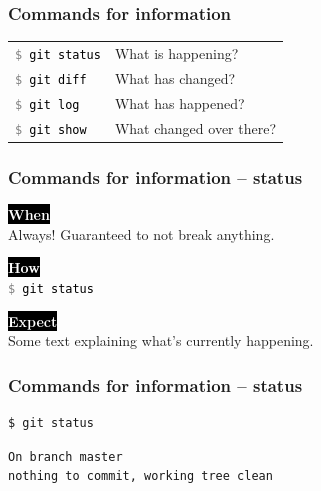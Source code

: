\documentclass{beamer}
\newcommand{\keyword}[1]{\hspace{-1.0em}\colorbox{black}{\textcolor{white}{\textbf{#1}\vphantom{Ep}}}\vspace{0.2em}} %
\newcommand{\command}[1]{\colorbox{black!90!white!10!}{\vphantom{Ep}\texttt{\textcolor{gray}{\$} \textcolor{black}{#1}}}}
\begin{document}
\begin{frame}[fragile]
  \frametitle{Commands for information}

  \begin{tabular}{ll}
    \command{git status} & What is happening? \\
    \command{git diff} & What has changed? \\
    \command{git log} & What has happened? \\
    \command{git show} & What changed over there? \\
  \end{tabular}

\end{frame}

\begin{frame}
  \frametitle{Commands for information -- status}

  \keyword{When}\\
  Always! Guaranteed to not break anything.
  \vspace{0.5em}

  \keyword{How}\\
  \command{git status}
  \vspace{0.5em}

  \keyword{Expect}\\
  Some text explaining what's currently happening.
\end{frame}

\begin{frame}[fragile]
  \frametitle{Commands for information -- status}

\begin{verbatim}
$ git status
\end{verbatim}
\pause{}
\begin{verbatim}
On branch master
nothing to commit, working tree clean
\end{verbatim}
\end{frame}
\end{document}
